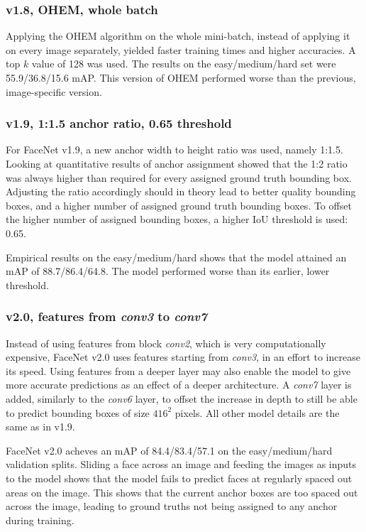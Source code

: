 \documentclass[a4paper, twoside]{article}
\begin{document}
\subsubsection{v1.8, OHEM, whole batch}
Applying the OHEM algorithm on the whole mini-batch, instead of applying it on every image separately, yielded faster training times and higher accuracies. A top $k$ value of 128 was used. The results on the easy/medium/hard set were 55.9/36.8/15.6 mAP. This version of OHEM performed worse than the previous, image-specific version.

\subsubsection{v1.9, 1:1.5 anchor ratio, 0.65 threshold}
For FaceNet v1.9, a new anchor width to height ratio was used, namely 1:1.5. Looking at quantitative results of anchor assignment showed that the 1:2 ratio was always higher than required for every assigned ground truth bounding box. Adjusting the ratio accordingly should in theory lead to better quality bounding boxes, and a higher number of assigned ground truth bounding boxes. To offset the higher number of assigned bounding boxes, a higher IoU threshold is used: 0.65.

Empirical results on the easy/medium/hard shows that the model attained an mAP of 88.7/86.4/64.8. The model performed worse than its earlier, lower threshold.

\subsubsection{v2.0, features from \textit{conv3} to \textit{conv7}}
Instead of using features from block \textit{conv2}, which is very computationally expensive, FaceNet v2.0 uses features starting from \textit{conv3}, in an effort to increase its speed. Using features from a deeper layer may also enable the model to give more accurate predictions as an effect of a deeper architecture. A \textit{conv7} layer is added, similarly to the \textit{conv6} layer, to offset the increase in depth to still be able to predict bounding boxes of size $416^2$ pixels. All other model details are the same as in v1.9.

FaceNet v2.0 acheves an mAP of 84.4/83.4/57.1 on the easy/medium/hard validation splits. Sliding a face across an image and feeding the images as inputs to the model shows that the model fails to predict faces at regularly spaced out areas on the image. This shows that the current anchor boxes are too spaced out across the image, leading to ground truths not being assigned to any anchor during training.
\end{document}
